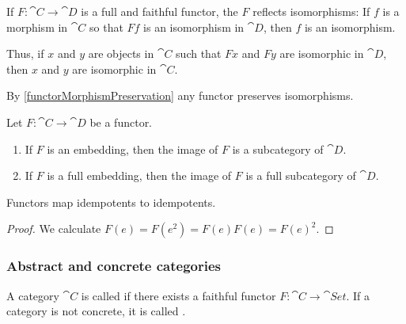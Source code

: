 \begin{lemma} \label{isomorphismCreationReflection}
If $F:\cat{C}\to\cat{D}$ is a full and faithful functor, the $F$ reflects isomorphisms:
If $f$ is a morphism in $\cat{C}$ so that $Ff$ is an isomorphism in $\cat{D}$, then $f$ is an isomorphism.
\end{lemma}
Thus, if $x$ and $y$ are objects in $\cat{C}$ such that $Fx$ and $Fy$ are isomorphic in $\cat{D}$, then $x$ and $y$ are isomorphic in $\cat{C}$.

By \ref{functorMorphismPreservation} any functor preserves isomorphisms.

\begin{proposition}
Let $F:\cat{C}\to\cat{D}$ be a functor.
\begin{enumerate}
\item If $F$ is an embedding, then the image of $F$ is a subcategory of $\cat{D}$.
\item If $F$ is a full embedding, then the image of $F$ is a full subcategory of $\cat{D}$.
\end{enumerate}
\end{proposition}

\begin{lemma}
Functors map idempotents to idempotents.
\end{lemma}
\begin{proof}
We calculate $F(e) = F(e^2) = F(e)F(e) = F(e)^2$.
\end{proof}

\subsubsection{Abstract and concrete categories}
\begin{definition}
A category $\cat{C}$ is called  if there exists a faithful functor $F: \cat{C} \to \cat{Set}$.
If a category is not concrete, it is called .
\end{definition}

